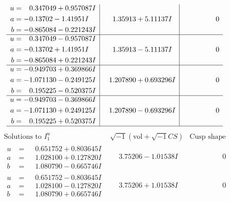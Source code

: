 \documentclass[1p]{elsarticle_modified}
\theoremstyle{definition}
\newcommand{\I}{\sqrt{-1}}
\begin{document}
$$\begin{array}{c|c|c}
\begin{aligned}
u &= \phantom{-}0.347049 + 0.957087 I \\
a &= -0.13702 - 1.41951 I \\
b &= -0.865084 - 0.221243 I\end{aligned}
 & \phantom{-}1.35913 + 5.11137 I & \phantom{-0.000000 } 0 \\ \hline\begin{aligned}
u &= \phantom{-}0.347049 - 0.957087 I \\
a &= -0.13702 + 1.41951 I \\
b &= -0.865084 + 0.221243 I\end{aligned}
 & \phantom{-}1.35913 - 5.11137 I & \phantom{-0.000000 } 0 \\ \hline\begin{aligned}
u &= -0.949703 + 0.369866 I \\
a &= -1.071130 - 0.249125 I \\
b &= \phantom{-}0.195225 - 0.520375 I\end{aligned}
 & \phantom{-}1.207890 + 0.693296 I & \phantom{-0.000000 } 0 \\ \hline\begin{aligned}
u &= -0.949703 - 0.369866 I \\
a &= -1.071130 + 0.249125 I \\
b &= \phantom{-}0.195225 + 0.520375 I\end{aligned}
 & \phantom{-}1.207890 - 0.693296 I & \phantom{-0.000000 } 0\\
 \hline 
 \end{array}$$\newpage$$\begin{array}{c|c|c}  
\text{Solutions to }I^u_{1}& \I (\text{vol} + \sqrt{-1}CS) & \text{Cusp shape}\\
 \hline 
\begin{aligned}
u &= \phantom{-}0.651752 + 0.803645 I \\
a &= \phantom{-}1.028100 + 0.127820 I \\
b &= \phantom{-}1.080790 - 0.665746 I\end{aligned}
 & \phantom{-}3.75206 - 1.01538 I & \phantom{-0.000000 } 0 \\ \hline\begin{aligned}
u &= \phantom{-}0.651752 - 0.803645 I \\
a &= \phantom{-}1.028100 - 0.127820 I \\
b &= \phantom{-}1.080790 + 0.665746 I\end{aligned}
 & \phantom{-}3.75206 + 1.01538 I & \phantom{-0.000000 } 0 \\ \hline\begin{aligned}

\end{aligned}
\end{array}$$
\end{document}
